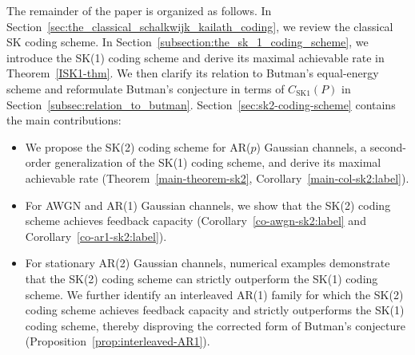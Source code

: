 \documentclass[12pt]{article}
\newcommand{\E}{\mathbb{E}}
\begin{document}
The remainder of the paper is organized as follows. In Section~\ref{sec:the_classical_schalkwijk_kailath_coding}, we review the classical SK coding scheme. In Section~\ref{subsection:the_sk_1_coding_scheme}, we introduce the SK(1) coding scheme and derive its maximal achievable rate in Theorem~\ref{ISK1-thm}. We then clarify its relation to Butman's equal-energy scheme and reformulate Butman's conjecture in terms of \(C_{\mathrm{SK1}}(P)\) in Section~\ref{subsec:relation_to_butman}. Section~\ref{sec:sk2-coding-scheme} contains the main contributions:
\begin{itemize}
\item[$\bullet$] We propose the SK(2) coding scheme for AR($p$) Gaussian channels, a second-order generalization of the SK(1) coding scheme, and derive its maximal achievable rate (Theorem~\ref{main-theorem-sk2}, Corollary~\ref{main-col-sk2:label}).
\item[$\bullet$]  For AWGN and AR(1) Gaussian channels, we show that the SK(2) coding scheme achieves feedback capacity (Corollary~\ref{co-awgn-sk2:label} and Corollary~\ref{co-ar1-sk2:label}).
\item[$\bullet$] For stationary AR(2) Gaussian channels, numerical examples demonstrate that the SK(2) coding scheme can strictly outperform the SK(1) coding scheme. We further identify an interleaved AR(1) family for which the SK(2) coding scheme achieves feedback capacity and strictly outperforms the SK(1) coding scheme, thereby disproving the corrected form of Butman's conjecture (Proposition~\ref{prop:interleaved-AR1}).
\end{itemize}

\end{document}
